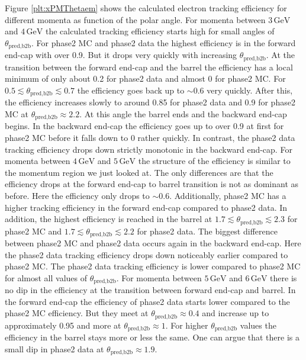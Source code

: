 \documentclass[a4paper,11pt,twosided,final,german,openbib,pdftex,listof=totoc,bibliography=totoc]{scrbook}
\begin{document}
Figure \ref{plt:xPMThetaem} shows the calculated electron tracking efficiency for different momenta as function of the polar angle. For momenta between $3\,\textrm{GeV}$ and $4\,\textrm{GeV}$ the calculated tracking efficiency starts high for small angles of $\theta_{\textrm{pred,b2b}}$. For phase2 MC and phase2 data the highest efficiency is in the forward end-cap with over 0.9. But it drops very quickly with increasing $\theta_{\textrm{pred,b2b}}$. At the transition between the forward end-cap and the barrel the efficiency has a local minimum of only  about 0.2 for phase2 data and almost 0 for phase2 MC.
For $0.5 \lesssim \theta_{\textrm{pred,b2b}} \lesssim 0.7$ the efficiency goes back up to $\sim 0.6$ very quickly. After this, the efficiency increases slowly to around 0.85 for phase2 data and 0.9 for phase2 MC at $\theta_{\textrm{pred,b2b}} \approx 2.2$. At this angle the barrel ends and the backward end-cap begins. 
In the backward end-cap the efficiency goes up to over 0.9 at first for phase2 MC before it falls down to 0 rather quickly. In contrast, the phase2 data tracking efficiency drops down strictly monotonic in the backward end-cap. 
For momenta between $4\,\textrm{GeV}$ and $5\,\textrm{GeV}$ the structure of the efficiency is similar to the momentum region we just looked at. The only differences are that the efficiency drops at the forward end-cap to barrel transition is not as dominant as before. Here the efficiency only drops to $\sim 0.6$. Additionally, phase2 MC has a higher tracking efficiency in the forward end-cap compared to phase2 data.
In addition, the highest efficiency is reached in the barrel at $1.7 \lesssim \theta_{\textrm{pred,b2b}} \lesssim 2.3$ for phase2 MC and $1.7 \lesssim \theta_{\textrm{pred,b2b}}  \lesssim 2.2$ for phase2 data. The biggest difference between phase2 MC and phase2 data occurs again in the backward end-cap. Here the phase2 data tracking efficiency drops down noticeably earlier compared to phase2 MC. The phase2 data tracking efficiency is lower compared to phase2 MC for almost all values of $\theta_{\textrm{pred,b2b}}$.
For momenta between $5\,\textrm{GeV}$ and $6\,\textrm{GeV}$ there is no dip in the efficiency at the transition between forward end-cap and barrel. In the forward end-cap the efficiency of phase2 data starts lower compared to the phase2 MC efficiency. But they meet at $\theta_{\textrm{pred,b2b}} \approx 0.4$  and increase up to approximately 0.95 and more at $\theta_{\textrm{pred,b2b}} \approx 1$.
For higher $\theta_{\textrm{pred,b2b}}$ values the efficiency in the barrel stays more or less the same. One can argue that there is a small dip in phase2 data at $\theta_{\textrm{pred,b2b}} \approx 1.9$.
\end{document}
